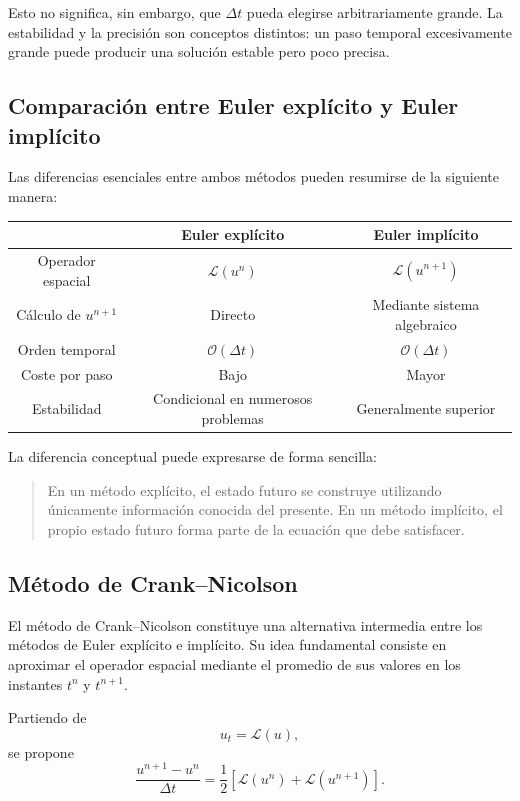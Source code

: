 \documentclass[12pt]{article}
\begin{document}
Esto no significa, sin embargo, que $\Delta t$ pueda elegirse arbitrariamente grande. La estabilidad y la precisión son conceptos distintos: un paso temporal excesivamente grande puede producir una solución estable pero poco precisa.

\subsection*{Comparación entre Euler explícito y Euler implícito}

Las diferencias esenciales entre ambos métodos pueden resumirse de la siguiente manera:
\begin{center}
\begin{tabular}{c|c|c}
    & Euler explícito & Euler implícito\\
    \hline
    Operador espacial
    &
    $\mathcal{L}(u^n)$
    &
    $\mathcal{L}(u^{n+1})$
    \\[0.2cm]
    Cálculo de $u^{n+1}$
    &
    Directo
    &
    Mediante sistema algebraico
    \\[0.2cm]
    Orden temporal
    &
    $\mathcal{O}(\Delta t)$
    &
    $\mathcal{O}(\Delta t)$
    \\[0.2cm]
    Coste por paso
    &
    Bajo
    &
    Mayor
    \\[0.2cm]
    Estabilidad
    &
    Condicional en numerosos problemas
    &
    Generalmente superior
\end{tabular}
\end{center}

La diferencia conceptual puede expresarse de forma sencilla:

\begin{quote}
En un método explícito, el estado futuro se construye utilizando únicamente información conocida del presente. En un método implícito, el propio estado futuro forma parte de la ecuación que debe satisfacer.
\end{quote}

\subsection*{Método de Crank--Nicolson}

El método de Crank--Nicolson constituye una alternativa intermedia entre los métodos de Euler explícito e implícito. Su idea fundamental consiste en aproximar el operador espacial mediante el promedio de sus valores en los instantes $t^n$ y $t^{n+1}$.

Partiendo de
\begin{equation}
    u_t
    =
    \mathcal{L}(u),
\end{equation}
se propone
\begin{equation}
    \frac{u^{n+1}-u^n}{\Delta t}
    =
    \frac{1}{2}
    \left[
        \mathcal{L}(u^n)
        +
        \mathcal{L}(u^{n+1})
    \right].
\end{equation}
\end{document}
